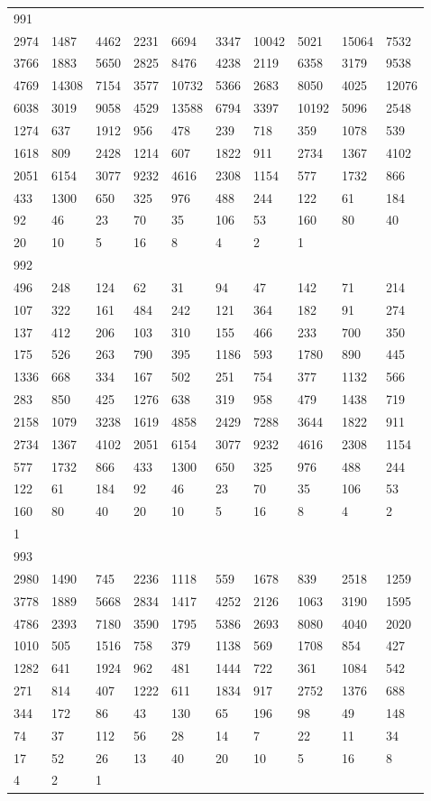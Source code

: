 \begin{longtable}{*{10}{l}}
991&&&&&&&&&\\
2974& 1487& 4462& 2231& 6694& 3347& 10042& 5021& 15064& 7532\\
3766& 1883& 5650& 2825& 8476& 4238& 2119& 6358& 3179& 9538\\
4769& 14308& 7154& 3577& 10732& 5366& 2683& 8050& 4025& 12076\\
6038& 3019& 9058& 4529& 13588& 6794& 3397& 10192& 5096& 2548\\
1274& 637& 1912& 956& 478& 239& 718& 359& 1078& 539\\
1618& 809& 2428& 1214& 607& 1822& 911& 2734& 1367& 4102\\
2051& 6154& 3077& 9232& 4616& 2308& 1154& 577& 1732& 866\\
433& 1300& 650& 325& 976& 488& 244& 122& 61& 184\\
92& 46& 23& 70& 35& 106& 53& 160& 80& 40\\
20& 10& 5& 16& 8& 4& 2& 1& \\

992&&&&&&&&&\\
496& 248& 124& 62& 31& 94& 47& 142& 71& 214\\
107& 322& 161& 484& 242& 121& 364& 182& 91& 274\\
137& 412& 206& 103& 310& 155& 466& 233& 700& 350\\
175& 526& 263& 790& 395& 1186& 593& 1780& 890& 445\\
1336& 668& 334& 167& 502& 251& 754& 377& 1132& 566\\
283& 850& 425& 1276& 638& 319& 958& 479& 1438& 719\\
2158& 1079& 3238& 1619& 4858& 2429& 7288& 3644& 1822& 911\\
2734& 1367& 4102& 2051& 6154& 3077& 9232& 4616& 2308& 1154\\
577& 1732& 866& 433& 1300& 650& 325& 976& 488& 244\\
122& 61& 184& 92& 46& 23& 70& 35& 106& 53\\
160& 80& 40& 20& 10& 5& 16& 8& 4& 2\\
1& \\

993&&&&&&&&&\\
2980& 1490& 745& 2236& 1118& 559& 1678& 839& 2518& 1259\\
3778& 1889& 5668& 2834& 1417& 4252& 2126& 1063& 3190& 1595\\
4786& 2393& 7180& 3590& 1795& 5386& 2693& 8080& 4040& 2020\\
1010& 505& 1516& 758& 379& 1138& 569& 1708& 854& 427\\
1282& 641& 1924& 962& 481& 1444& 722& 361& 1084& 542\\
271& 814& 407& 1222& 611& 1834& 917& 2752& 1376& 688\\
344& 172& 86& 43& 130& 65& 196& 98& 49& 148\\
74& 37& 112& 56& 28& 14& 7& 22& 11& 34\\
17& 52& 26& 13& 40& 20& 10& 5& 16& 8\\
4& 2& 1& \\


\end{longtable}

